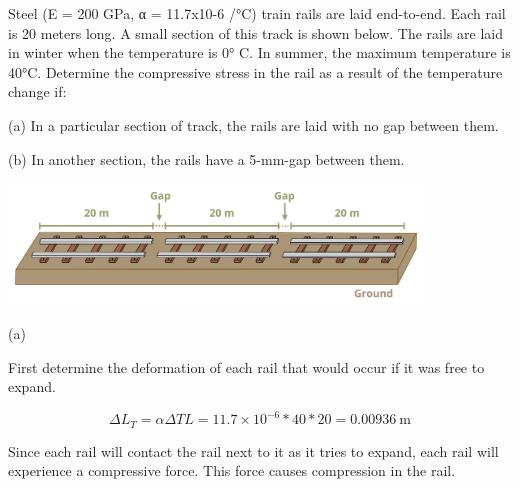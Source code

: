 \documentclass[
  letterpaper,
  DIV=11,
  numbers=noendperiod]{scrreprt}
\begin{document}
\begin{tcolorbox}[enhanced jigsaw, colback=white, colframe=quarto-callout-note-color-frame, leftrule=.75mm, opacitybacktitle=0.6, colbacktitle=quarto-callout-note-color!10!white, arc=.35mm, bottomrule=.15mm, breakable, title={Example 5.8: Indeterminate thermal expansion without gap. Then add gap
and rework}, left=2mm, titlerule=0mm, toptitle=1mm, toprule=.15mm, opacityback=0, rightrule=.15mm, coltitle=black, bottomtitle=1mm]

Steel (E = 200 GPa, α = 11.7x10-6 /°C) train rails are laid end-to-end.
Each rail is 20 meters long. A small section of this track is shown
below. The rails are laid in winter when the temperature is 0° C. In
summer, the maximum temperature is 40°C. Determine the compressive
stress in the rail as a result of the temperature change if:

(a) In a particular section of track, the rails are laid with no gap
between them.

(b) In another section, the rails have a 5-mm-gap between them.

\begin{center}
\includegraphics[width=4.33333in,height=\textheight]{images/PNGs/Example 5.8.png}
\end{center}

\begin{tcolorbox}[enhanced jigsaw, colback=white, colframe=quarto-callout-note-color-frame, leftrule=.75mm, opacitybacktitle=0.6, colbacktitle=quarto-callout-note-color!10!white, arc=.35mm, bottomrule=.15mm, breakable, title={Solution}, left=2mm, titlerule=0mm, toptitle=1mm, toprule=.15mm, opacityback=0, rightrule=.15mm, coltitle=black, bottomtitle=1mm]

(a)

First determine the deformation of each rail that would occur if it was
free to expand.

\[
\Delta L_T=\alpha \Delta T L=11.7 \times 10^{-6} * 40 * 20=0.00936 \mathrm{~m}
\]

Since each rail will contact the rail next to it as it tries to expand,
each rail will experience a compressive force. This force causes
compression in the rail.


\end{tcolorbox}
\end{tcolorbox}
\end{document}
